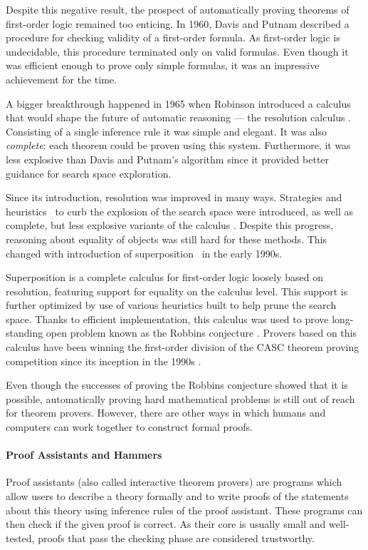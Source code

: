 Despite this negative result, the prospect of automatically proving theorems of
first-order logic remained too enticing. In 1960, Davis and Putnam
\cite{dp-60-dp} described a procedure for checking validity of a
first-order formula. As first-order logic is undecidable, this procedure
terminated only on valid formulas. Even though it was efficient enough to prove
only simple formulas, it was an impressive achievement for the time.

A bigger breakthrough happened in 1965 when Robinson introduced a calculus that
would shape the future of automatic reasoning --- the resolution calculus
\cite{ar-65-resolution}. Consisting of a single inference rule it was simple and
elegant. It was also \emph{complete}: each theorem could be proven using this
system. Furthermore, it was less explosive than Davis and Putnam's algorithm
since it provided better guidance for search space exploration.

Since its introduction, resolution was improved in many ways. Strategies and
heuristics~\cite{lw-65-sos} to curb the explosion of the search space were
introduced, as well as complete, but less explosive variants of the calculus
\cite{cc-73-resolution-book}. Despite this progress, reasoning about equality of
objects was still hard for these methods. This changed with introduction of
superposition~\cite{bg-94-superposition} in the early 1990s.

Superposition is a complete calculus for first-order logic loosely based on
resolution, featuring support for equality on the calculus level. This support
is further optimized by use of various heuristics built to help prune the
search space. Thanks to efficient implementation, this calculus was used to
prove long-standing open problem known as the Robbins conjecture
\cite{mccune-97-robbins}. Provers based on this calculus have been
winning the first-order division of the CASC theorem proving competition since its
inception in the 1990s \cite{ss-96-casc}.

Even though the successes of proving the Robbins conjecture showed that it is
possible, automatically proving hard mathematical problems is still out of reach
for theorem provers. However, there are other ways in which humans and computers can work together to construct formal
proofs.

\paragraph{Proof Assistants and Hammers} Proof assistants (also called interactive
theorem provers) are programs which allow users to describe a theory formally
and to write proofs of the statements about this theory using inference 
rules of the proof assistant. These programs can then check if the given proof
is correct. As their core is usually small and well-tested, proofs that pass the
checking phase are considered trustworthy.

